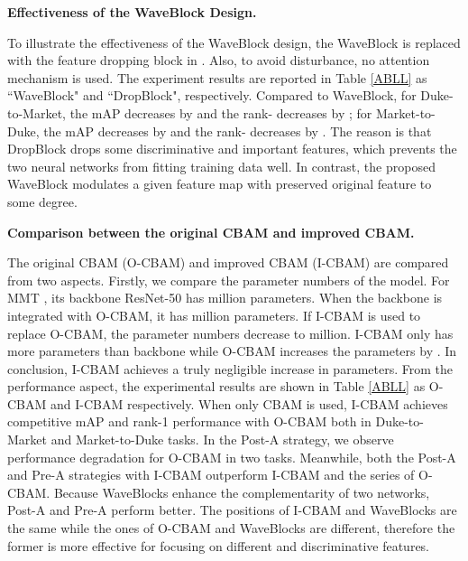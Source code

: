 \documentclass[journal]{IEEEtran}
\begin{document}
\textbf{Effectiveness of the WaveBlock Design.}\par 
To illustrate the effectiveness of the WaveBlock design, the WaveBlock is replaced with the feature dropping block in \cite{dai2019batch}. Also, to avoid disturbance, no attention mechanism is used. The experiment results are reported in Table \ref{ABLL} as ``WaveBlock" and ``DropBlock", respectively. Compared to WaveBlock, for Duke-to-Market, the mAP decreases by 
and the rank- decreases by ; for Market-to-Duke, the mAP decreases by  and the rank- decreases by . The reason is that DropBlock drops some discriminative and important features, which prevents the two neural networks from fitting training data well. In contrast, the proposed WaveBlock modulates a given feature map with preserved original feature to some degree.

\textbf{Comparison between the original CBAM and improved CBAM.}\par 
The original CBAM (O-CBAM) and improved CBAM (I-CBAM) are compared from two aspects. Firstly, we compare the parameter numbers of the model. For MMT \cite{ge2020mutual}, its backbone ResNet-50 has  million parameters. When the backbone is integrated with O-CBAM, it has  million parameters. If I-CBAM is used to replace O-CBAM, the parameter numbers decrease to  million. I-CBAM only has  more parameters than backbone while O-CBAM increases the parameters by . In conclusion, I-CBAM achieves a truly negligible increase in parameters. From the performance aspect, the experimental results are shown in Table \ref{ABLL} as O-CBAM and I-CBAM respectively. When only CBAM is used, I-CBAM achieves competitive mAP and rank-1 performance with O-CBAM both in Duke-to-Market and Market-to-Duke tasks. In the Post-A strategy, we observe performance degradation for O-CBAM in two tasks. Meanwhile, both the Post-A and Pre-A strategies with I-CBAM outperform I-CBAM and the series of O-CBAM. Because WaveBlocks enhance the complementarity of two networks, Post-A and Pre-A perform better. The positions of I-CBAM and WaveBlocks are the same while the ones of O-CBAM and WaveBlocks are different, therefore the former is more effective for focusing on different and discriminative features.
\end{document}
